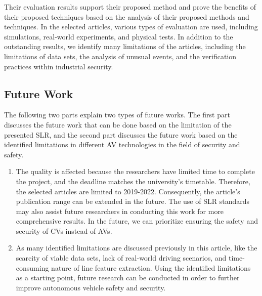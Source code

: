 \documentclass[a4paper,12pt]{article}
\begin{document}
Their evaluation results support their proposed method and prove the benefits of their proposed techniques based on the analysis of their proposed methods and techniques. In the selected articles, various types of evaluation are used, including simulations, real-world experiments, and physical tests. In addition to the outstanding results, we identify many limitations of the articles, including the limitations of data sets, the analysis of unusual events, and the verification practices within industrial security.\par

\newpage
\subsection{Future Work}
\hspace{5mm}The following two parts explain two types of future works. The first part discusses the future work that can be done based on the limitation of the presented SLR, and the second part discusses the future work based on the identified limitations in different AV technologies in the field of security and safety.
\begin{enumerate}
\item The quality is affected because the researchers have limited time to complete the project, and the deadline matches the university's timetable. Therefore, the selected articles are limited to 2019-2022. Consequently, the article's publication range can be extended in the future. The use of SLR standards may also assist future researchers in conducting this work for more comprehensive results. In the future, we can prioritize ensuring the safety and security of CVs instead of AVs.
\item As many identified limitations are discussed previously in this article, like the scarcity of viable data sets, lack of real-world driving scenarios, and time-consuming nature of line feature extraction. Using the identified limitations as a starting point, future research can be conducted in order to further improve autonomous vehicle safety and security.
\end{enumerate}




%
\newpage
\hypersetup{urlcolor=black}


\end{document}
